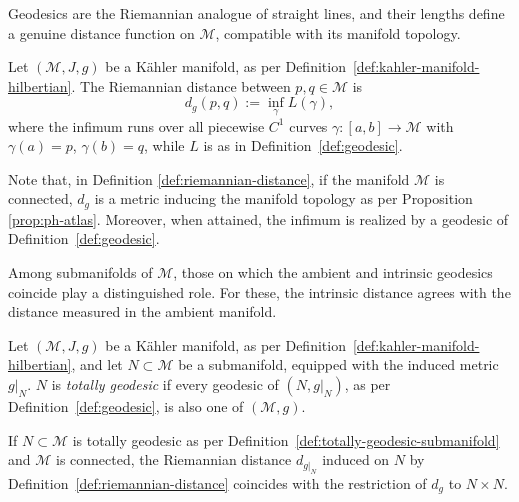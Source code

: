 \noindent Geodesics are the Riemannian analogue of straight lines, and their
lengths define a genuine distance function on $\mathcal{M}$, compatible with
its manifold topology.

\begin{definition}
	\label{def:riemannian-distance}
	Let $(\mathcal{M},J,g)$ be a Kähler manifold, as per Definition~\ref{def:kahler-manifold-hilbertian}. The Riemannian distance between
	$p,q\in\mathcal{M}$ is
	\begin{equation}
		d_g(p,q):=\inf_\gamma L(\gamma),
	\end{equation}
	where the infimum runs over all piecewise $C^1$ curves
	$\gamma:[a,b]\to\mathcal{M}$ with $\gamma(a)=p$, $\gamma(b)=q$, while $L$ is
	as in Definition~\ref{def:geodesic}. 
\end{definition}

\begin{remark}
	Note that, in Definition \ref{def:riemannian-distance}, if the manifold $\mathcal{M}$ is connected, $d_g$ is a metric inducing the manifold topology as per Proposition \ref{prop:ph-atlas}. Moreover, when attained, the infimum is realized by a geodesic of Definition~\ref{def:geodesic}.
\end{remark}

\noindent Among submanifolds of $\mathcal{M}$, those on which the ambient and
intrinsic geodesics coincide play a distinguished role. For these, the intrinsic distance agrees with the distance measured in the ambient manifold.

\begin{definition}
	\label{def:totally-geodesic-submanifold}
	Let $(\mathcal{M},J,g)$ be a Kähler manifold, as per Definition~\ref{def:kahler-manifold-hilbertian}, and let $N\subset\mathcal{M}$ be a
	submanifold, equipped with the induced metric $g|_N$. $N$ is
	\emph{totally geodesic} if every geodesic of $(N,g|_N)$, as per
	Definition~\ref{def:geodesic}, is also one of $(\mathcal{M},g)$.
\end{definition}

\begin{remark}
	\label{rem:totally-geodesic-distance}
	If $N\subset\mathcal{M}$ is totally geodesic as per
	Definition~\ref{def:totally-geodesic-submanifold} and $\mathcal{M}$ is
	connected, the Riemannian distance $d_{g|_N}$ induced on $N$ by
	Definition~\ref{def:riemannian-distance} coincides with the restriction
	of $d_g$ to $N\times N$.
\end{remark}


